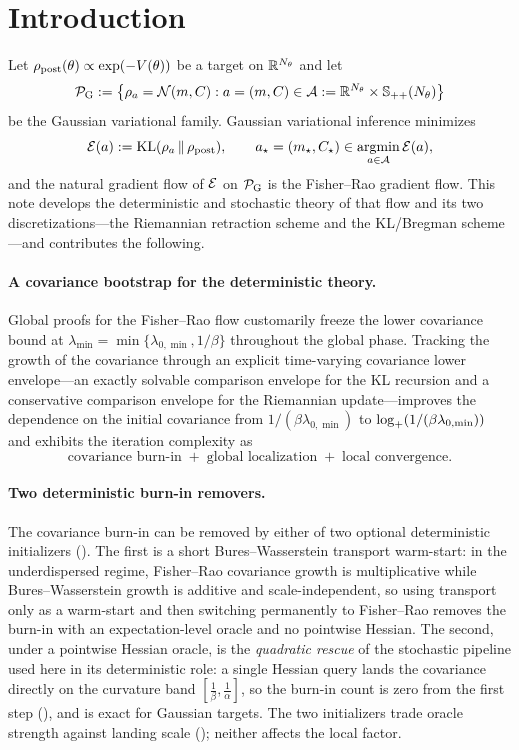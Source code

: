 \tableofcontents

\section{Introduction}
\label{sec:intro}

Let $\rho_{\mathrm{post}}(\theta)\propto\exp(-V(\theta))$ be a target on $\mathbb{R}^{N_\theta}$ and let
\[
    \mathcal{P}_{\mathrm G}:=\bigl\{\rho_a=\mathcal{N}(m,C):a=(m,C)\in\mathcal{A}:=\mathbb{R}^{N_\theta}\times\mathbb{S}_{++}(N_\theta)\bigr\}
\]
be the Gaussian variational family. Gaussian variational inference minimizes
\[
    \mathcal{E}(a):=\mathrm{KL}(\rho_a\,\|\,\rho_{\mathrm{post}}),
    \qquad
    a_\star=(m_\star,C_\star)\in\operatorname*{argmin}_{a\in\mathcal{A}}\mathcal{E}(a),
\]
and the natural gradient flow of $\mathcal{E}$ on $\mathcal{P}_{\mathrm G}$ is the Fisher--Rao gradient flow. This note
develops the deterministic and stochastic theory of that flow and its two discretizations---the
Riemannian retraction scheme and the KL/Bregman scheme---and contributes the following.

\paragraph{A covariance bootstrap for the deterministic theory.}
Global proofs for the Fisher--Rao flow customarily freeze the lower covariance bound at
$\lambda_{\min}=\min\{\lambda_{0,\min},1/\beta\}$ throughout the global phase. Tracking the growth
of the covariance through an explicit time-varying covariance lower envelope---an exactly solvable
comparison envelope for the KL recursion and a conservative comparison envelope for the Riemannian
update---improves the
dependence on the initial covariance from $1/(\beta\lambda_{0,\min})$ to $\log_+(1/(\beta\lambda_{0,\min}))$ and
exhibits the iteration complexity as
\[
    \boxed{\;
    \text{covariance burn-in}
    \;+\;
    \text{global localization}
    \;+\;
    \text{local convergence}.
    \;}
\]

\paragraph{Two deterministic burn-in removers.}
The covariance burn-in can be removed by either of two optional deterministic initializers
(). The first is a short Bures--Wasserstein transport warm-start: in the
underdispersed regime, Fisher--Rao covariance growth is multiplicative while Bures--Wasserstein growth
is additive and scale-independent, so using transport only as a warm-start and then switching
permanently to Fisher--Rao removes the burn-in with an expectation-level oracle and no pointwise
Hessian. The second, under a pointwise Hessian oracle, is the \emph{quadratic rescue} of the
stochastic pipeline used here in its deterministic role: a single Hessian query lands the covariance
directly on the curvature band $[\tfrac1\beta,\tfrac1\alpha]$, so the burn-in count is zero from the
first step (), and is exact for Gaussian targets. The two initializers
trade oracle strength against landing scale (); neither affects the local
factor.

